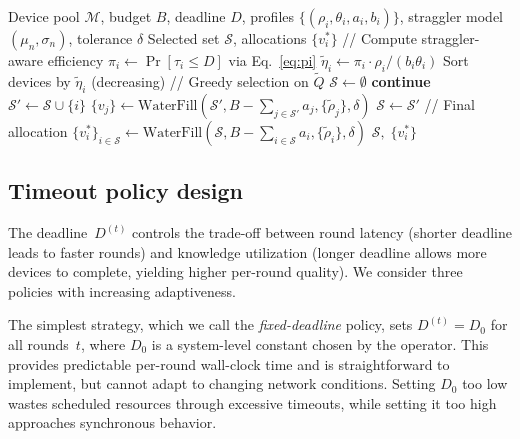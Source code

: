 \documentclass[a4paper,fleqn]{cas-dc}
\newcommand{\Mset}{\mathcal{M}}
\newcommand{\Sset}{\mathcal{S}}
\begin{document}
	\begin{algorithm}[t]
		\caption{DASH-Select: Straggler-Aware Scheduling}
		\label{alg:dash_select}
		\begin{algorithmic}[1]
			\REQUIRE Device pool $\Mset$, budget $B$, deadline $D$,
			profiles $\{(\rho_i, \theta_i, a_i, b_i)\}$,
			straggler model $(\mu_n, \sigma_n)$, tolerance $\delta$
			\ENSURE Selected set $\Sset$, allocations $\{v_i^*\}$
			\STATE // Compute straggler-aware efficiency
			\FOR{each $i \in \Mset$}
			\STATE $\pi_i \gets \Pr[\tau_i \leq D]$
			via Eq.~\eqref{eq:pi}
			\STATE $\tilde{\eta}_i \gets
			\pi_i \cdot \rho_i / (b_i \theta_i)$
			\ENDFOR
			\STATE Sort devices by $\tilde{\eta}_i$ (decreasing)
			\STATE // Greedy selection on $\tilde{Q}$
			\STATE $\Sset \gets \emptyset$
			\IF{$a_i + \sum_{j \in \Sset} a_j > B$}
			\STATE \textbf{continue}
			\ENDIF
			\STATE $\Sset' \gets \Sset \cup \{i\}$
			\STATE $\{v_j\} \!\gets\!
			\mathrm{WaterFill}(\Sset',
			B {-} \textstyle\sum_{j \in \Sset'}\! a_j,
			\{\tilde{\rho}_j\}, \delta)$
			\IF{$\tilde{Q}(\Sset') > \tilde{Q}(\Sset)$}
			\STATE $\Sset \gets \Sset'$
			\ENDIF
			\ENDFOR
			\STATE // Final allocation
			\STATE $\{v_i^*\}_{i \in \Sset} \!\gets\!
			\mathrm{WaterFill}(\Sset,
			B {-} \textstyle\sum_{i \in \Sset}\! a_i,
			\{\tilde{\rho}_i\}, \delta)$
			\RETURN $\Sset,\; \{v_i^*\}$
		\end{algorithmic}
	\end{algorithm}
	
	\subsection{Timeout policy design}\label{sec:timeout}
	
	The deadline~$D^{(t)}$ controls the trade-off between round latency
	(shorter deadline leads to faster rounds) and knowledge utilization
	(longer deadline allows more devices to complete, yielding higher
	per-round quality).  We consider three policies with increasing
	adaptiveness.
	
	The simplest strategy, which we call the \emph{fixed-deadline} policy,
	sets $D^{(t)} = D_0$ for all rounds~$t$, where $D_0$ is a
	system-level constant chosen by the operator.  This provides
	predictable per-round wall-clock time and is straightforward to
	implement, but cannot adapt to changing network conditions.  Setting
	$D_0$ too low wastes scheduled resources through excessive timeouts,
	while setting it too high approaches synchronous behavior.
	
\end{document}
